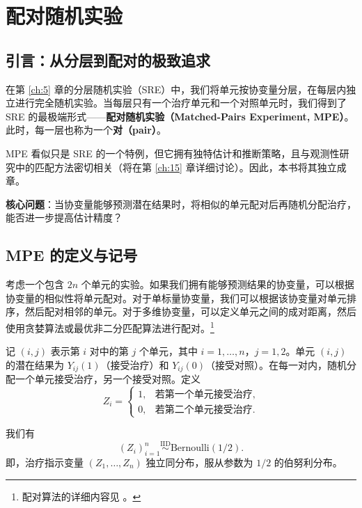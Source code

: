 
\chapter{配对随机实验}\label{ch:7}

\section{引言：从分层到配对的极致追求}\label{sec:7-intro}

在第 \ref{ch:5} 章的分层随机实验（SRE）中，我们将单元按协变量分层，在每层内独立进行完全随机实验。当每层只有一个治疗单元和一个对照单元时，我们得到了 SRE 的最极端形式——\textbf{配对随机实验（Matched-Pairs Experiment, MPE）}。此时，每一层也称为一个\textbf{对（pair）}。

MPE 看似只是 SRE 的一个特例，但它拥有独特估计和推断策略，且与观测性研究中的匹配方法密切相关（将在第 \ref{ch:15} 章详细讨论）。因此，本书将其独立成章。

\textbf{核心问题}：当协变量能够预测潜在结果时，将相似的单元配对后再随机分配治疗，能否进一步提高估计精度？

\section{MPE 的定义与记号}\label{sec:7-definition}

考虑一个包含 $2n$ 个单元的实验。如果我们拥有能够预测结果的协变量，可以根据协变量的相似性将单元配对。对于单标量协变量，我们可以根据该协变量对单元排序，然后配对相邻的单元。对于多维协变量，可以定义单元之间的成对距离，然后使用贪婪算法或最优非二分匹配算法进行配对。\footnote{配对算法的详细内容见 \cite{Greevy:2004}。}

记 $(i,j)$ 表示第 $i$ 对中的第 $j$ 个单元，其中 $i = 1, \dots, n$，$j = 1, 2$。单元 $(i,j)$ 的潜在结果为 $Y_{ij}(1)$（接受治疗）和 $Y_{ij}(0)$（接受对照）。在每一对内，随机分配一个单元接受治疗，另一个接受对照。定义
\begin{equation}
Z_i =
\begin{cases}
1, & \text{若第一个单元接受治疗}, \\
0, & \text{若第二个单元接受治疗}.
\end{cases}
\label{eq:7-treatment-indicator}
\end{equation}

\begin{Definition}\label{def:7-mpe}
我们有
\[
(Z_i)_{i=1}^n \stackrel{\text{IID}}{\sim} \text{Bernoulli}(1/2).
\]
即，治疗指示变量 $(Z_1, \dots, Z_n)$ 独立同分布，服从参数为 $1/2$ 的伯努利分布。
\end{Definition}

